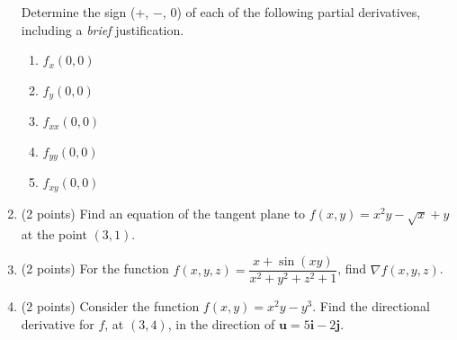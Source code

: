 \documentclass[11pt]{article}
\newcommand{\imb}{\mb{i}}
\newcommand{\jmb}{\mb{j}}
\newcommand{\mb}[1]{\mathbf{#1}}
\begin{document}
\begin{enumerate}
    Determine the sign (+, \(-\),  0) of each of the following partial derivatives, including a \textit{brief} justification.
    \begin{enumerate}
        \item \(f_{x}(0,0)\)
        \item \(f_{y}(0,0)\)
        \item \(f_{xx}(0,0)\)
        \item \(f_{yy}(0,0)\)
        \item \(f_{xy}(0,0)\)
    \end{enumerate}
    \item (2 points) Find an equation of the tangent plane to \(f(x,y) = x^{2}y - \sqrt{x} + y\) at the point \((3,1)\).
    \item (2 points) For the function \(f(x,y,z) = \dfrac{x + \sin(xy)}{x^{2} + y^{2} + z^{2} + 1}\), find \(\nabla f(x,y,z)\).
    \item (2 points) Consider the function \(f(x,y) = x^{2}y - y^{3}\). Find the directional derivative for \(f\), at \((3,4)\), in the direction of \(\mb{u} = 5\imb - 2\jmb\).
\end{enumerate}
\end{document}
